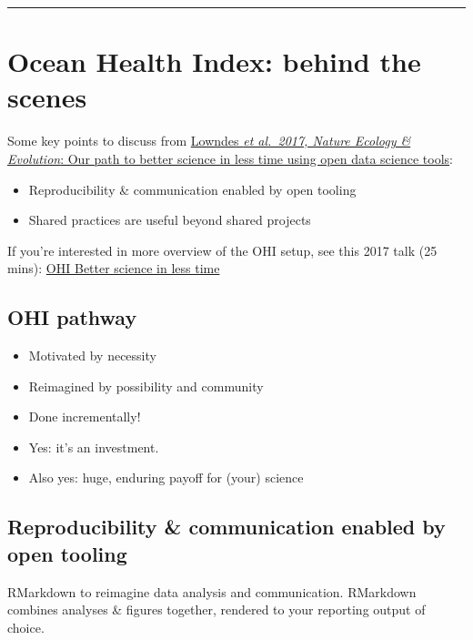 \documentclass[
  letterpaper,
  DIV=11,
  numbers=noendperiod]{scrreprt}
\providecommand{\tightlist}{%
  \setlength{\itemsep}{0pt}\setlength{\parskip}{0pt}}
\begin{document}
\begin{center}\rule{0.5\linewidth}{0.5pt}\end{center}

\hypertarget{ocean-health-index-behind-the-scenes}{%
\section{Ocean Health Index: behind the
scenes}\label{ocean-health-index-behind-the-scenes}}

Some key points to discuss from
\href{https://www.nature.com/articles/s41559-017-0160}{Lowndes \emph{et
al.~2017, Nature Ecology \& Evolution}: Our path to better science in
less time using open data science tools}:

\begin{itemize}
\tightlist
\item
  Reproducibility \& communication enabled by open tooling
\item
  Shared practices are useful beyond shared projects
\end{itemize}

If you're interested in more overview of the OHI setup, see this 2017
talk (25 mins): \href{https://www.youtube.com/watch?v=x4uzVAZvFCA}{OHI
Better science in less time}

\hypertarget{ohi-pathway}{%
\subsection{OHI pathway}\label{ohi-pathway}}

\begin{itemize}
\tightlist
\item
  Motivated by necessity
\item
  Reimagined by possibility and community
\item
  Done incrementally!
\item
  Yes: it's an investment.
\item
  Also yes: huge, enduring payoff for (your) science
\end{itemize}

\hypertarget{reproducibility-communication-enabled-by-open-tooling}{%
\subsection{Reproducibility \& communication enabled by open
tooling}\label{reproducibility-communication-enabled-by-open-tooling}}

RMarkdown to reimagine data analysis and communication. RMarkdown
combines analyses \& figures together, rendered to your reporting output
of choice.
\end{document}
